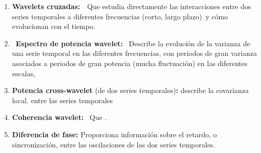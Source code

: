 \documentclass[a4paper,fleqn]{cas-sc}
\begin{document}
\begin{enumerate}

    \item  \textbf{Wavelets cruzadas:}  Que estudia directamente las interacciones entre dos series temporales a diferentes frecuencias (corto, largo plazo) y cómo evolucionan con el tiempo. 

    \item  \textbf{Espectro de potencia wavelet:}  Describe la evolución de la varianza de una serie temporal en las diferentes frecuencias, con periodos de gran varianza asociados a periodos de gran potencia (mucha fluctuación) en las diferentes escalas, 

\item  \textbf{Potencia cross-wavelet} (de dos series temporales)\textbf{:} describe la covarianza local. entre las series temporales 

    \item  \textbf{Coherencia wavelet:}  Que .

    \item  \textbf{Diferencia de fase:} Proporciona información sobre el retardo, o sincronización, entre las oscilaciones de las dos series temporales.

\end{enumerate}

\printcredits





\bio{}
\endbio
\end{document}
